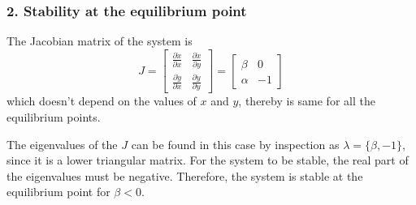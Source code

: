 \subsubsection*{2. Stability at the equilibrium point}

The Jacobian matrix of the system is
\[
    J = \begin{bmatrix}
        \frac{\partial \dot{x}}{\partial x} & \frac{\partial \dot{x}}{\partial y} \\
        \frac{\partial \dot{y}}{\partial x} & \frac{\partial \dot{y}}{\partial y}
    \end{bmatrix}
    = \begin{bmatrix}
        \beta  & 0  \\
        \alpha & -1
    \end{bmatrix}
\]
which doesn't depend on the values of \( x \) and \( y \), thereby is same for all the equilibrium points.

The eigenvalues of the \( J \) can be found in this case by inspection as \( \lambda = \{ \beta, -1 \} \), since it is a lower triangular matrix.
For the system to be stable, the real part of the eigenvalues must be negative.
Therefore, the system is stable at the equilibrium point for \( \boxed{ \beta < 0 } \).

